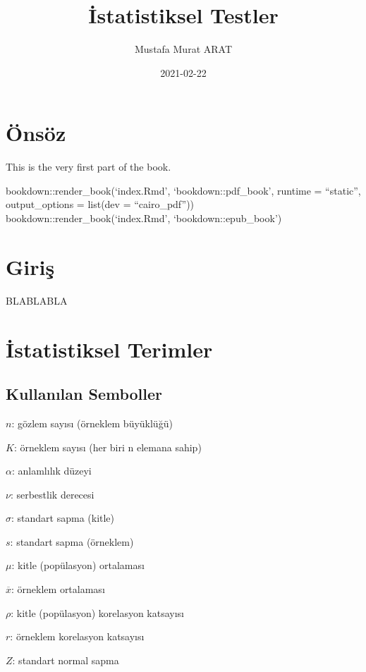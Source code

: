 \documentclass[
  12pt,
]{book}
\title{İstatistiksel Testler}
\author{Mustafa Murat ARAT}
\date{2021-02-22}
\begin{document}
\maketitle

{
\setcounter{tocdepth}{3}
\tableofcontents
}
\hypertarget{uxf6nsuxf6z}{%
\chapter*{Önsöz}\label{uxf6nsuxf6z}}

This is the very first part of the book.

bookdown::render\_book(`index.Rmd', `bookdown::pdf\_book', runtime = ``static'', output\_options = list(dev = ``cairo\_pdf''))
bookdown::render\_book(`index.Rmd', `bookdown::epub\_book')

\hypertarget{introduction}{%
\chapter{Giriş}\label{introduction}}

BLABLABLA

\hypertarget{statisticalterms}{%
\chapter{İstatistiksel Terimler}\label{statisticalterms}}

\hypertarget{kullanux131lan-semboller}{%
\section{Kullanılan Semboller}\label{kullanux131lan-semboller}}

\(n\): gözlem sayısı (örneklem büyüklüğü)

\(K\): örneklem sayısı (her biri n elemana sahip)

\(\alpha\): anlamlılık düzeyi

\(\nu\): serbestlik derecesi

\(\sigma\): standart sapma (kitle)

\(s\): standart sapma (örneklem)

\(\mu\): kitle (popülasyon) ortalaması

\(\overline{x}\): örneklem ortalaması

\(\rho\): kitle (popülasyon) korelasyon katsayısı

\(r\): örneklem korelasyon katsayısı

\(Z\): standart normal sapma
\end{document}
